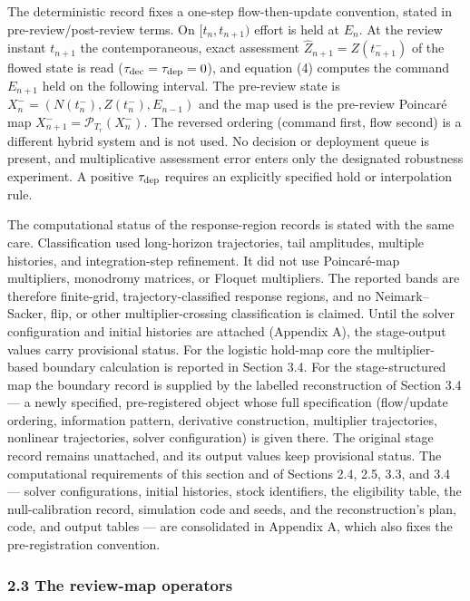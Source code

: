 \documentclass[11pt]{article}
\begin{document}
The deterministic record fixes a one-step flow-then-update convention,
stated in pre-review/post-review terms. On \([t_n, t_{n+1})\) effort is
held at \(E_n\). At the review instant \(t_{n+1}\) the contemporaneous,
exact assessment \(\widehat Z_{n+1} = Z(t_{n+1}^-)\) of the flowed state
is read (\(\tau_{\rm dec}=\tau_{\rm dep}=0\)), and equation (4) computes
the command \(E_{n+1}\) held on the following interval. The pre-review
state is \(X_n^-=(N(t_n^-),Z(t_n^-),E_{n-1})\) and the map used is
the pre-review Poincar\'e map \(X_{n+1}^-=\mathcal P_{T_r}(X_n^-)\). The
reversed ordering (command first, flow second) is a different hybrid
system and is not used. No decision or deployment queue is present, and
multiplicative assessment error enters only the designated robustness
experiment. A positive \(\tau_{\rm dep}\) requires an explicitly
specified hold or interpolation rule.

The computational status of the response-region records is stated with
the same care. Classification used long-horizon trajectories, tail
amplitudes, multiple histories, and integration-step refinement. It did
not use Poincar\'e-map multipliers, monodromy matrices, or Floquet
multipliers. The reported bands are therefore finite-grid,
trajectory-classified response regions, and no Neimark--Sacker, flip, or
other multiplier-crossing classification is claimed. Until the solver
configuration and initial histories are attached (Appendix A), the
stage-output values carry provisional status. For the logistic hold-map
core the multiplier-based boundary calculation is reported in Section 3.4. For the
stage-structured map the boundary record is supplied by the labelled
reconstruction of Section 3.4 --- a newly specified, pre-registered
object whose full specification (flow/update ordering, information
pattern, derivative construction, multiplier trajectories, nonlinear
trajectories, solver configuration) is given there. The original
stage record remains unattached, and its output values keep provisional
status. The computational requirements of this
section and of Sections 2.4, 2.5, 3.3, and 3.4 --- solver
configurations, initial histories, stock identifiers, the eligibility
table, the null-calibration record, simulation code and seeds, and the
reconstruction's plan, code, and output tables --- are consolidated in
Appendix A, which also fixes the pre-registration convention.

\subsubsection{2.3 The review-map
operators}\label{the-review-map-operators}
\end{document}

